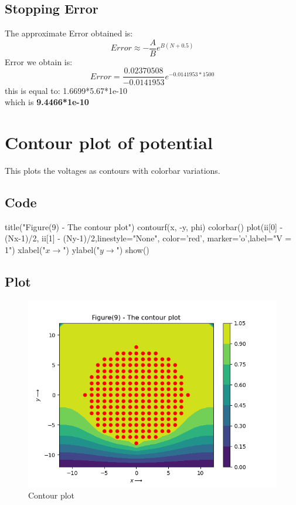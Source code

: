 \documentclass[11pt]{article}
\begin{document}
\subsection{Stopping Error}
The approximate Error obtained is:
\begin{equation}
    Error \approx -\frac{A}{B}e^{B(N + 0.5)}
\end{equation}
Error we obtain is:
\begin{equation}
    Error = \frac{0.02370508}{-0.0141953} e^{-0.0141953*1500}
\end{equation}
this is equal to:   1.6699*5.67*1e-10 \\
which is \textbf{9.4466*1e-10}

\section{Contour plot of potential}
This plots the voltages as contours with colorbar variations.

\subsection{Code}
\begin{python}
title("Figure(9) - The contour plot")
contourf(x, -y, phi)
colorbar()
plot(ii[0] - (Nx-1)/2, ii[1] - (Ny-1)/2,linestyle="None", color='red', marker='o',label="V = 1")
xlabel("$x\longrightarrow$")
ylabel("$y\longrightarrow$")
show()
\end{python}

\subsection{Plot}
\begin{figure}[H]
    \centering
    \includegraphics[scale = 1]{Figure_10.png}
    \caption{Contour plot}
\end{figure}
\end{document}
